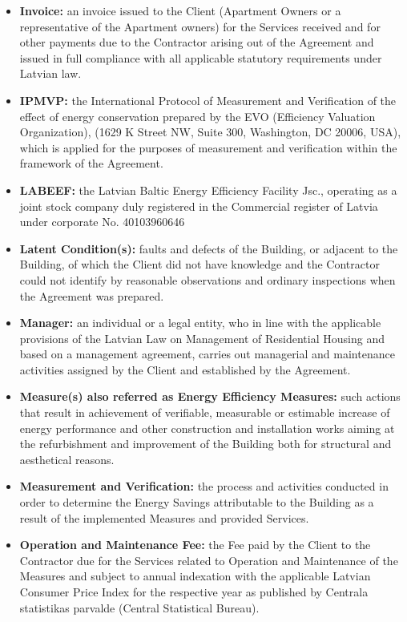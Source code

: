 \begin{multicols}{2}
\begin{itemize}[label={}]
	\item\textbf{Invoice:} an invoice issued to the Client (Apartment Owners or a representative of the Apartment owners) for the Services received and for other payments due to the Contractor arising out of the Agreement and issued in full compliance with all applicable statutory requirements under Latvian law.
	\item\textbf{IPMVP:} the International Protocol of Measurement and Verification of the effect of energy conservation prepared by the EVO (Efficiency Valuation Organization), (1629 K Street NW, Suite 300, Washington, DC 20006, USA), which is applied for the purposes of measurement and verification within the framework of the Agreement.
	\item\textbf{LABEEF:} the Latvian Baltic Energy Efficiency Facility Jsc., operating as a joint stock company duly registered in the Commercial register of Latvia under corporate No. 40103960646
	\item\textbf{Latent Condition(s):} faults and defects of the Building, or adjacent to the Building, of which the Client did not have knowledge and the Contractor could not identify by reasonable observations and ordinary inspections when the Agreement was prepared.
	\item\textbf{Manager:} an individual or a legal entity, who in line with the applicable provisions of the Latvian Law on Management of Residential Housing and based on a management agreement, carries out managerial and maintenance activities assigned by the Client and established by the Agreement.
	\item\textbf{Measure(s) also referred as Energy Efficiency Measures:} such actions that result in achievement of verifiable, measurable or estimable increase of energy performance and other construction and installation works aiming at the refurbishment and improvement of the Building both for structural and aesthetical reasons.
	\item\textbf{Measurement and Verification:} the process and activities conducted in order to determine the Energy Savings attributable to the Building as a result of the implemented Measures and provided Services.
	\item\textbf{Operation and Maintenance Fee:} the Fee paid by the Client to the Contractor due for the Services related to Operation and Maintenance of the Measures and subject to annual indexation with the applicable Latvian Consumer Price Index for the respective year as published by Centrala statistikas parvalde (Central Statistical Bureau).

\end{itemize}
\end{multicols}
